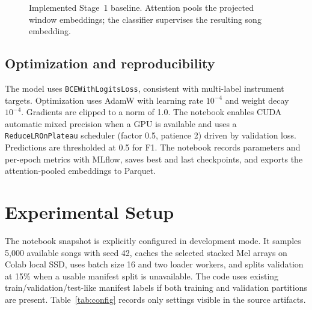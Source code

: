 \documentclass[conference]{IEEEtran}
\begin{document}
\begin{figure}[t]
\centering
{}
\caption{Implemented Stage~1 baseline. Attention pools the projected window embeddings; the classifier supervises the resulting song embedding.}
\label{fig:baseline}
\end{figure}

\subsection{Optimization and reproducibility}
The model uses \texttt{BCEWithLogitsLoss}, consistent with multi-label instrument targets. Optimization uses AdamW with learning rate $10^{-4}$ and weight decay $10^{-4}$. Gradients are clipped to a norm of 1.0. The notebook enables CUDA automatic mixed precision when a GPU is available and uses a \texttt{ReduceLROnPlateau} scheduler (factor 0.5, patience 2) driven by validation loss. Predictions are thresholded at 0.5 for F1. The notebook records parameters and per-epoch metrics with MLflow, saves best and last checkpoints, and exports the attention-pooled embeddings to Parquet.

\section{Experimental Setup}
The notebook snapshot is explicitly configured in development mode. It samples 5,000 available songs with seed 42, caches the selected stacked Mel arrays on Colab local SSD, uses batch size 16 and two loader workers, and splits validation at 15\% when a usable manifest split is unavailable. The code uses existing train/validation/test-like manifest labels if both training and validation partitions are present. Table~\ref{tab:config} records only settings visible in the source artifacts.
\end{document}
